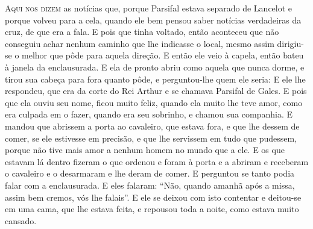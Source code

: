 \textsc{Aqui nos dizem} as notícias que, porque Parsifal estava separado de
Lancelot e porque volveu para a cela, quando ele bem pensou saber notícias
verdadeiras da cruz, de que era a fala. E pois que tinha voltado, então
aconteceu que não conseguiu achar nenhum caminho que lhe indicasse o local,
mesmo assim dirigiu-se o melhor que pôde para aquela direção. E então ele veio
à capela, então bateu à janela da enclausurada. E ela de pronto abriu como
aquela que nunca dorme, e tirou sua cabeça para fora quanto pôde, e
perguntou-lhe quem ele seria: E ele lhe respondeu, que era da corte do Rei
Arthur e se chamava Parsifal de Gales. E pois que ela ouviu seu nome, ficou
muito feliz, quando ela muito lhe teve amor, como era culpada em o fazer,
quando era seu sobrinho, e chamou sua companhia. E mandou que abrissem a porta
ao cavaleiro, que estava fora, e que lhe dessem de comer, se ele estivesse em
precisão, e que lhe servissem em tudo que pudessem, porque não tive mais amor a
nenhum homem no mundo que a ele. E os que estavam lá dentro fizeram o que
ordenou e foram à porta e a abriram e receberam o cavaleiro e o desarmaram e
lhe deram de comer. E perguntou se tanto podia falar com a enclausurada. E eles
falaram: “Não, quando amanhã após a missa, assim bem cremos, vós lhe falais”. E
ele se deixou com isto contentar e deitou-se em uma cama, que lhe estava feita,
e repousou toda a noite, como estava muito cansado. 

